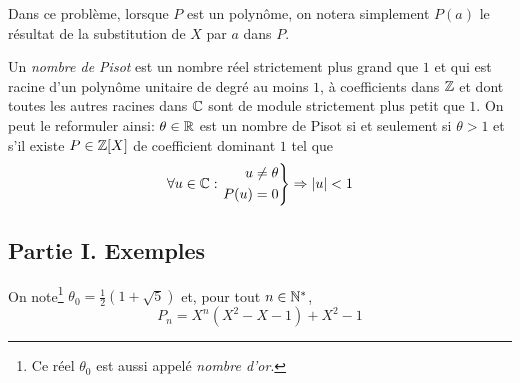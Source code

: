 Dans ce problème, lorsque $P$ est un polynôme, on notera simplement $P(a)$ le résultat de la substitution de $X$ par $a$ dans $P$.

Un \emph{nombre de Pisot} est un nombre réel strictement plus grand que $1$ et qui est racine d'un polynôme unitaire de degré au moins $1$, à coefficients dans $\mathbb{Z}$ et dont toutes les autres racines dans $\mathbb{C}$ sont de module strictement plus petit que $1$.\newline
On peut le reformuler ainsi: $\theta\in \mathbb{R}$ est un nombre de Pisot si et seulement si $\theta>1$ et s'il existe $P\in \mathbb{Z}[X]$ de coefficient dominant $1$ tel que 
\begin{displaymath}
 \forall u\in \mathbb{C}:
\left. 
\begin{aligned}
 u\neq \theta \\ P(u)=0
\end{aligned}
\right\rbrace \Rightarrow |u|<1
\end{displaymath}

\subsection*{Partie I. Exemples}
On note\footnote{Ce réel $\theta_0$ est aussi appelé \emph{nombre d'or}.} $\theta_0=\frac{1}{2}(1+\sqrt{5})$ et, pour tout $n\in \mathbb{N}^*$, 
\begin{displaymath}
 P_n = X^n(X^2-X-1)+X^2-1
\end{displaymath}

